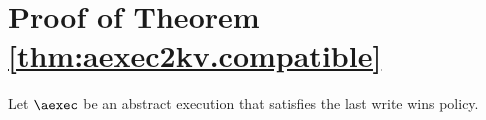 \section{Proof of Theorem \ref{thm:aexec2kv.compatible}}
\label{app:aexec2kv}

Let $\aexec$ be an abstract execution that satisfies the last write wins 
policy.

%
%
%
%
%
%

